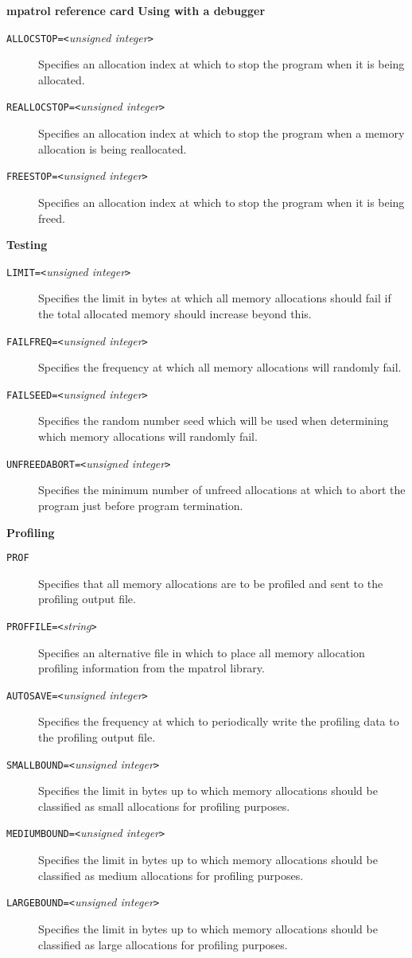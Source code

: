 \documentclass[a4paper,landscape,final]{article}
\newcommand{\heading}[1]{\textbf{\normalsize #1}}
\newcommand{\option}[1]{\texttt{#1}}
\newcommand{\optionpar}[2]{\option{#1}\texttt{=<}\textit{#2}\texttt{>}}
\begin{document}
\begin{multicols}{3}{\textbf{\Large mpatrol reference card}}
\vskip 12pt
\heading{Using with a debugger}
\vskip 6pt

\begin{description}
\item[\optionpar{ALLOCSTOP}{unsigned integer}]
Specifies an allocation index at which to stop the program when it is being
allocated.
\item[\optionpar{REALLOCSTOP}{unsigned integer}]
Specifies an allocation index at which to stop the program when a memory
allocation is being reallocated.
\item[\optionpar{FREESTOP}{unsigned integer}]
Specifies an allocation index at which to stop the program when it is being
freed.
\end{description}

\vskip 12pt
\heading{Testing}
\vskip 6pt

\begin{description}
\item[\optionpar{LIMIT}{unsigned integer}]
Specifies the limit in bytes at which all memory allocations should fail if the
total allocated memory should increase beyond this.
\item[\optionpar{FAILFREQ}{unsigned integer}]
Specifies the frequency at which all memory allocations will randomly fail.
\item[\optionpar{FAILSEED}{unsigned integer}]
Specifies the random number seed which will be used when determining which
memory allocations will randomly fail.
\item[\optionpar{UNFREEDABORT}{unsigned integer}]
Specifies the minimum number of unfreed allocations at which to abort the
program just before program termination.
\end{description}

\vskip 12pt
\heading{Profiling}
\vskip 6pt

\begin{description}
\item[\option{PROF}]
Specifies that all memory allocations are to be profiled and sent to the
profiling output file.
\item[\optionpar{PROFFILE}{string}]
Specifies an alternative file in which to place all memory allocation profiling
information from the mpatrol library.
\item[\optionpar{AUTOSAVE}{unsigned integer}]
Specifies the frequency at which to periodically write the profiling data to the
profiling output file.
\item[\optionpar{SMALLBOUND}{unsigned integer}]
Specifies the limit in bytes up to which memory allocations should be classified
as small allocations for profiling purposes.
\item[\optionpar{MEDIUMBOUND}{unsigned integer}]
Specifies the limit in bytes up to which memory allocations should be classified
as medium allocations for profiling purposes.
\item[\optionpar{LARGEBOUND}{unsigned integer}]
Specifies the limit in bytes up to which memory allocations should be classified
as large allocations for profiling purposes.
\end{description}


\end{multicols}
\end{document}
